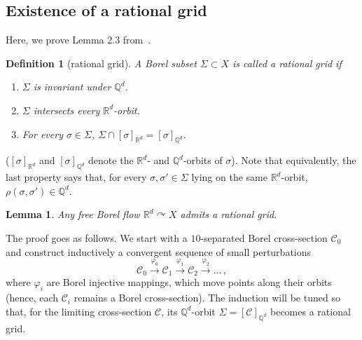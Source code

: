 \documentclass[11pt]{paper}
\newtheorem{lemma}{Lemma}
\newtheorem*{definition*}{Definition}
\newcommand{\bR}{\mathbb R}
\newcommand{\bQ}{\mathbb Q}
\newcommand{\cC}{\mathcal C}
\begin{document}
\subsection{Existence of a rational grid}
\noindent Here, we prove Lemma 2.3 from~\cite{Slutsky2017}.
\begin{definition*}[rational grid]
A Borel subset $\Sigma\subset X$ is called a rational grid if
\begin{enumerate}
\item $\Sigma$ is invariant under $\bQ^d$.
\item $\Sigma$ intersects every $\bR^d$-orbit.
\item For every $\sigma\in\Sigma$, $\Sigma\cap [\sigma]_{\bR^d} = [\sigma]_{\bQ^d}$.
\end{enumerate}
\end{definition*}
\noindent ($[\sigma]_{\bR^d}$ and $[\sigma]_{\bQ^d}$ denote the $\bR^d$- and $\bQ^d$-orbits of $\sigma$).
Note that equivalently, the last property says that, for every
$\sigma, \sigma'\in\Sigma$ lying on the same $\bR^d$-orbit, $\rho(\sigma, \sigma')\in \bQ^d$.
\begin{lemma}
\label{lemma:rational-grid}
Any free Borel flow $\bR^d\curvearrowright X$ admits a rational grid.
\end{lemma}
The proof goes as follows. We start with a $10$-separated Borel cross-section $\cC_0$ and
construct inductively a convergent sequence of small perturbations
\[
\cC_0 \xrightarrow{\varphi_0} \cC_1 \xrightarrow{\varphi_1}\cC_2 \xrightarrow{\varphi_2} \ldots \,,
\]
where $\varphi_i$ are Borel injective mappings, which move points along their orbits (hence,
each $\cC_i$ remains a Borel cross-section).
The induction will be tuned so that, for the limiting cross-section $\cC$, its $\bQ^d$-orbit
$\Sigma = [\cC]_{\bQ^d}$ becomes a rational grid.
\end{document}
